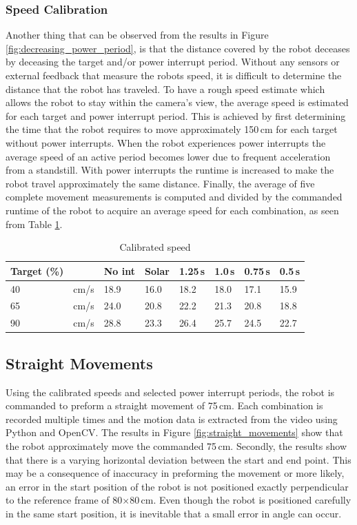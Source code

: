 \subsubsection{Speed Calibration}
Another thing that can be observed from the results in Figure \ref{fig:decreasing_power_period}, is that the distance covered by the robot deceases by deceasing the target and/or power interrupt period.
Without any sensors or external feedback that measure the robots speed, it is difficult to determine the distance that the robot has traveled.
To have a rough speed estimate which allows the robot to stay within the camera's view, the average speed is estimated for each target and power interrupt period.
This is achieved by first determining the time that the robot requires to move approximately 150\,cm for each target without power interrupts.
When the robot experiences power interrupts the average speed of an active period becomes lower due to frequent acceleration from a standstill.
With power interrupts the runtime is increased to make the robot travel approximately the same distance.
Finally, the average of five complete movement measurements is computed and divided by the commanded runtime of the robot to acquire an average speed for each combination, as seen from Table \ref{tab:val_calib}.


\begin{table}[t]
	\centering
	\small
	\caption{Calibrated speed}
	\label{tab:val_calib}
	\begin{tabular}{|l|l||l|l|l|l|l|l|}
		\hline
		Target (\%) & & No int & Solar & 1.25\,s & 1.0\,s & 0.75\,s & 0.5\,s \\
		\hline \hline
		 40 & cm/s & 18.9 & 16.0 & 18.2 & 18.0 & 17.1 & 15.9 \\
	     65 & cm/s & 24.0 & 20.8 & 22.2 & 21.3 & 20.8 & 18.8 \\
		 90 & cm/s & 28.8 & 23.3 & 26.4 & 25.7 & 24.5 & 22.7 \\
		\hline
	\end{tabular}
\end{table}

\subsection{Straight Movements}

Using the calibrated speeds and selected power interrupt periods, the robot is commanded to preform a straight movement of 75\,cm.
Each combination is recorded multiple times and the motion data is extracted from the video using Python and OpenCV.
The results in Figure \ref{fig:straight_movements} show that the robot approximately move the commanded 75\,cm.
Secondly, the results show that there is a varying horizontal deviation between the start and end point.
This may be a consequence of inaccuracy in preforming the movement or more likely, an error in the start position of the robot is not positioned exactly perpendicular to the reference frame of 80$\times$80\,cm.
Even though the robot is positioned carefully in the same start position, it is inevitable that a small error in angle can occur.

